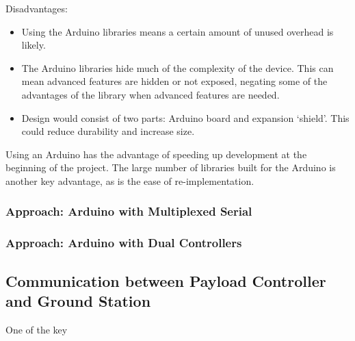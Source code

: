 Disadvantages:
\begin{itemize}
\item Using the Arduino libraries means a certain amount of unused overhead is likely.

\item The Arduino libraries hide much of the complexity of the device. This can mean advanced features are hidden or not exposed, negating some of the advantages of the library when advanced features are needed.

\item Design would consist of two parts: Arduino board and expansion `shield'. This could reduce durability and increase size.
\end{itemize}

Using an Arduino has the advantage of speeding up development at the beginning of the project. The large number of libraries built for the Arduino is another key advantage, as is the ease of re-implementation.

\subsubsection{Approach: Arduino with Multiplexed Serial}

\subsubsection{Approach: Arduino with Dual Controllers}


\subsection{Communication between Payload Controller and Ground Station}
One of the key 